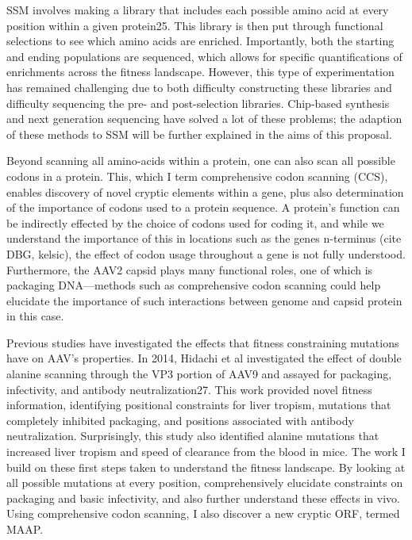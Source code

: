 SSM involves making a library that includes each possible amino acid at every position within a given protein25. This library is then put through functional selections to see which amino acids are enriched. Importantly, both the starting and ending populations are sequenced, which allows for specific quantifications of enrichments across the fitness landscape. However, this type of experimentation has remained challenging due to both difficulty constructing these libraries and difficulty sequencing the pre- and post-selection libraries. Chip-based synthesis and next generation sequencing have solved a lot of these problems; the adaption of these methods to SSM will be further explained in the aims of this proposal.  

Beyond scanning all amino-acids within a protein, one can also scan all possible codons in a protein. This, which I term comprehensive codon scanning (CCS), enables discovery of novel cryptic elements within a gene, plus also determination of the importance of codons used to a protein sequence. A protein’s function can be indirectly effected by the choice of codons used for coding it, and while we understand the importance of this in locations such as the genes n-terminus (cite DBG, kelsic), the effect of codon usage throughout a gene is not fully understood. Furthermore, the AAV2 capsid plays many functional roles, one of which is packaging DNA---methods such as comprehensive codon scanning could help elucidate the importance of such interactions between genome and capsid protein in this case.

Previous studies have investigated the effects that fitness constraining mutations have on AAV’s properties. In 2014, Hidachi et al investigated the effect of double alanine scanning through the VP3 portion of AAV9 and assayed for packaging, infectivity, and antibody neutralization27. This work provided novel fitness information, identifying positional constraints for liver tropism, mutations that completely inhibited packaging, and positions associated with antibody neutralization. Surprisingly, this study also identified alanine mutations that increased liver tropism and speed of clearance from the blood in mice. The work I build on these first steps taken to understand the fitness landscape. By looking at all possible mutations at every position, comprehensively elucidate constraints on packaging and basic infectivity, and also further understand these effects in vivo. Using comprehensive codon scanning, I also discover a new cryptic ORF, termed MAAP. 

